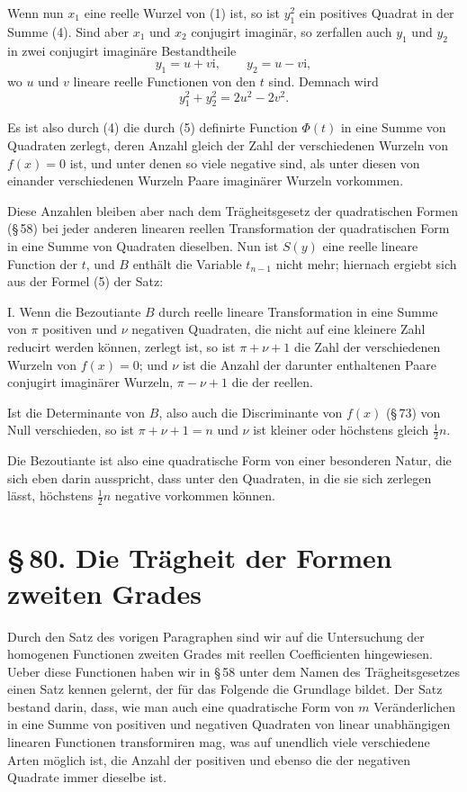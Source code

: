 \documentclass[11pt]{article}
\providecommand{\ii}{\mathrm{i}}
\providecommand{\sect}[2]{\section*{\S\,#1. #2}}
\begin{document}
Wenn nun $x_1$ eine reelle Wurzel von (1) ist, so ist $y_1^2$ ein positives Quadrat in der Summe (4). Sind aber $x_1$ und $x_2$ conjugirt imagin\"ar, so zerfallen auch $y_1$ und $y_2$ in zwei conjugirt imagin\"are Bestandtheile
\[
        y_1=u+v\ii,
        \qquad
        y_2=u-v\ii,
\]
wo $u$ und $v$ lineare reelle Functionen von den $t$ sind. Demnach wird
\[
        y_1^2+y_2^2=2u^2-2v^2.
\]

Es ist also durch (4) die durch (5) definirte Function $\Phi(t)$ in eine Summe von Quadraten zerlegt, deren Anzahl gleich der Zahl der verschiedenen Wurzeln von $f(x)=0$ ist, und unter denen so viele negative sind, als unter diesen von einander verschiedenen Wurzeln Paare imagin\"arer Wurzeln vorkommen.

Diese Anzahlen bleiben aber nach dem Tr\"agheitsgesetz der quadratischen Formen (\S\,58) bei jeder anderen linearen reellen Transformation der quadratischen Form in eine Summe von Quadraten dieselben. Nun ist $S(y)$ eine reelle lineare Function der $t$, und $B$ enth\"alt die Variable $t_{n-1}$ nicht mehr; hiernach ergiebt sich aus der Formel (5) der Satz:

I. Wenn die Bezoutiante $B$ durch reelle lineare Transformation in eine Summe von $\pi$ positiven und $\nu$ negativen Quadraten, die nicht auf eine kleinere Zahl reducirt werden k\"onnen, zerlegt ist, so ist $\pi+\nu+1$ die Zahl der verschiedenen Wurzeln von $f(x)=0$; und $\nu$ ist die Anzahl der darunter enthaltenen Paare conjugirt imagin\"arer Wurzeln, $\pi-\nu+1$ die der reellen.

Ist die Determinante von $B$, also auch die Discriminante von $f(x)$ (\S\,73) von Null verschieden, so ist $\pi+\nu+1=n$ und $\nu$ ist kleiner oder h\"ochstens gleich $\frac12n$.

Die Bezoutiante ist also eine quadratische Form von einer besonderen Natur, die sich eben darin ausspricht, dass unter den Quadraten, in die sie sich zerlegen l\"asst, h\"ochstens $\frac12n$ negative vorkommen k\"onnen.

\sect{80}{Die Tr\"agheit der Formen zweiten Grades}

Durch den Satz des vorigen Paragraphen sind wir auf die Untersuchung der homogenen Functionen zweiten Grades mit reellen Coefficienten hingewiesen. Ueber diese Functionen haben wir in \S\,58 unter dem Namen des Tr\"agheitsgesetzes einen Satz kennen gelernt, der f\"ur das Folgende die Grundlage bildet. Der Satz bestand darin, dass, wie man auch eine quadratische Form von $m$ Ver\"anderlichen in eine Summe von positiven und negativen Quadraten von linear unabh\"angigen linearen Functionen transformiren mag, was auf unendlich viele verschiedene Arten m\"oglich ist, die Anzahl der positiven und ebenso die der negativen Quadrate immer dieselbe ist.
\end{document}
